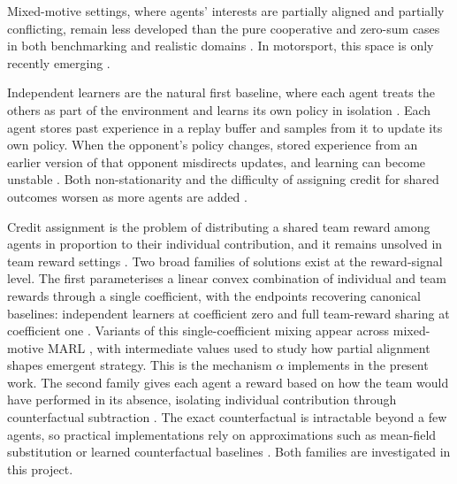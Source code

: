 Mixed-motive settings, where agents' interests are partially aligned and partially conflicting, remain less developed than the pure cooperative and zero-sum cases in both benchmarking and realistic domains \citep{du2023cooperation}. In motorsport, this space is only recently emerging \citep{fieni2026learning}.

Independent learners are the natural first baseline, where each agent treats the others as part of the environment and learns its own policy in isolation \citep{tan1993multiagent}. Each agent stores past experience in a replay buffer and samples from it to update its own policy. When the opponent's policy changes, stored experience from an earlier version of that opponent misdirects updates, and learning can become unstable \citep{foerster2017stabilising, matignon2012independent}. Both non-stationarity and the difficulty of assigning credit for shared outcomes worsen as more agents are added \citep{agogino2004unifying, zhao2025maca}.

Credit assignment is the problem of distributing a shared team reward among agents in proportion to their individual contribution, and it remains unsolved in team reward settings \citep{panait2005cooperative, ningxie2024marl}. Two broad families of solutions exist at the reward-signal level. The first parameterises a linear convex combination of individual and team rewards through a single coefficient, with the endpoints recovering canonical baselines: independent learners at coefficient zero \citep{tan1993multiagent} and full team-reward sharing at coefficient one \citep{rashid2018qmix}. Variants of this single-coefficient mixing appear across mixed-motive MARL \citep{leibo2017multiagent, hughes2018inequity, wang2022irat}, with intermediate values used to study how partial alignment shapes emergent strategy. This is the mechanism $\alpha$ implements in the present work. The second family gives each agent a reward based on how the team would have performed in its absence, isolating individual contribution through counterfactual subtraction \citep{wolpert2001optimal, devlin2014potential}. The exact counterfactual is intractable beyond a few agents, so practical implementations rely on approximations such as mean-field substitution \citep{yang2018meanfield} or learned counterfactual baselines \citep{foerster2018coma}. Both families are investigated in this project.

